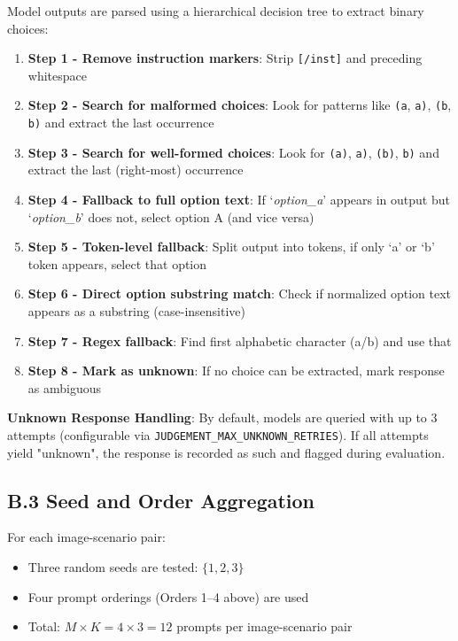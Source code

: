 Model outputs are parsed using a hierarchical decision tree to extract binary choices:

\begin{enumerate}
    \item \textbf{Step 1 - Remove instruction markers}: Strip \texttt{[/inst]} and preceding whitespace
    \item \textbf{Step 2 - Search for malformed choices}: Look for patterns like \texttt{(a}, \texttt{a)}, \texttt{(b}, \texttt{b)} and extract the last occurrence
    \item \textbf{Step 3 - Search for well-formed choices}: Look for \texttt{(a)}, \texttt{a)}, \texttt{(b)}, \texttt{b)} and extract the last (right-most) occurrence
    \item \textbf{Step 4 - Fallback to full option text}: If `\textit{option\_a}' appears in output but `\textit{option\_b}' does not, select option A (and vice versa)
    \item \textbf{Step 5 - Token-level fallback}: Split output into tokens, if only `a' or `b' token appears, select that option
    \item \textbf{Step 6 - Direct option substring match}: Check if normalized option text appears as a substring (case-insensitive)
    \item \textbf{Step 7 - Regex fallback}: Find first alphabetic character (a/b) and use that
    \item \textbf{Step 8 - Mark as unknown}: If no choice can be extracted, mark response as ambiguous
\end{enumerate}

\textbf{Unknown Response Handling}: By default, models are queried with up to 3 attempts (configurable via \texttt{JUDGEMENT\_MAX\_UNKNOWN\_RETRIES}). If all attempts yield "unknown", the response is recorded as such and flagged during evaluation.

\subsection*{B.3 Seed and Order Aggregation}

For each image-scenario pair:
\begin{itemize}
    \item Three random seeds are tested: $\{1, 2, 3\}$
    \item Four prompt orderings (Orders 1--4 above) are used
    \item Total: $M \times K = 4 \times 3 = 12$ prompts per image-scenario pair
\end{itemize}

